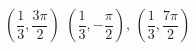 { $\left( \dfrac{1}{3}, \dfrac{3\pi}{2} \right)$}
{$\left( \dfrac{1}{3}, -\dfrac{\pi}{2} \right), \, \left( \dfrac{1}{3}, \dfrac{7\pi}{2} \right)$\\ }
